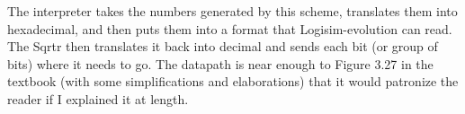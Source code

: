 \documentclass[12pt, oneside]{memoir}
\begin{document}
The interpreter takes the numbers generated by this scheme, translates them into hexadecimal, and then puts them into a format that Logisim-evolution can read. The Sqrtr then translates it back into decimal and sends each bit (or group of bits) where it needs to go. The datapath is near enough to Figure 3.27 in the textbook (with some simplifications and elaborations) that it would patronize the reader if I explained it at length.

\end{document}
